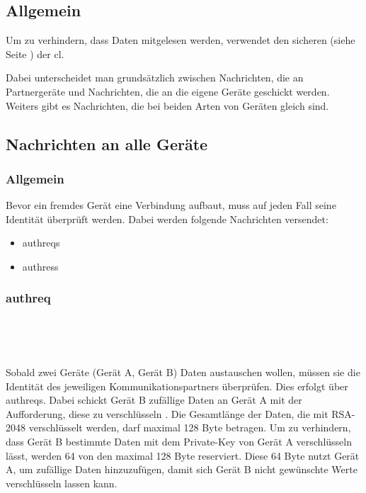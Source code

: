 \subsection{Allgemein}
Um zu verhindern, dass Daten mitgelesen werden, verwendet \sblit den sicheren  (siehe Seite \pageref{Applicationchannel}) der \gls{cl}.

Dabei unterscheidet man grundsätzlich zwischen Nachrichten, die an Partnergeräte  und Nachrichten, die an die eigene Geräte geschickt werden. Weiters gibt es Nachrichten, die bei beiden Arten von Geräten gleich sind.

\subsection{Nachrichten an alle Geräte}
\subsubsection{Allgemein}
Bevor ein fremdes Gerät eine Verbindung aufbaut, muss auf jeden Fall seine Identität überprüft werden. Dabei werden folgende Nachrichten versendet:
\begin{itemize}
	\item \gls{authreq}s
	\item \gls{authres}s
\end{itemize}

\subsubsection{\gls{authreq}}
\messagestart
	 \\
	
	\begin{rightwordgroup}{\isprotomsgtype}
	\end{rightwordgroup} \\
	
	\begin{rightwordgroup}{\isprotomsgdata}
	\end{rightwordgroup}
	
Sobald zwei Geräte (Gerät A, Gerät B) Daten austauschen wollen, müssen sie die Identität des jeweiligen Kommunikationspartners überprüfen. Dies erfolgt über \gls{authreq}s. Dabei schickt Gerät B zufällige Daten an Gerät A mit der Aufforderung, diese zu verschlüsseln . 
Die Gesamtlänge der Daten, die mit RSA-2048 verschlüsselt werden, darf maximal 128 Byte betragen. Um zu verhindern, dass Gerät B bestimmte Daten mit dem Private-Key von Gerät A verschlüsseln lässt, werden 64 von den maximal 128 Byte reserviert. Diese 64 Byte nutzt Gerät A, um zufällige Daten hinzuzufügen, damit sich Gerät B nicht gewünschte Werte verschlüsseln lassen kann.

